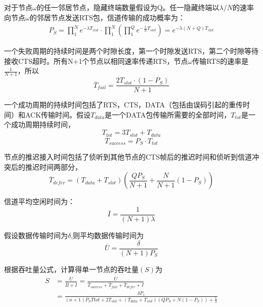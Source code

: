 对于节点$\omega$的任一邻居节点，隐藏终端数量假设为Q。任一隐藏终端以$\lambda/N$的速率向节点$\omega$的邻居节点发送RTS包，信道传输的成功概率为：
\begin{equation}
\begin{aligned}
P_S=\prod^N_1 e^{-\lambda T_{slot}}\cdot \prod^N_1 (\prod^Q_1 e^{-\frac{\lambda}{N} T_{slot}})= e^{-\lambda (N+Q) T_{slot}}
\end{aligned}
\end{equation}

一个失败周期的持续时间是两个时隙长度，第一个时隙发送RTS，第二个时隙等待接收CTS超时。所有N+1个节点以相同速率传递RTS，节点$\omega$传输RTS的速率是$\frac{1}{N+1}$，所以
\begin{equation}
\overline T_{fail}=\frac{{2T_{slot}}\cdot(1-P_S)}{N+1}
\end{equation}

一个成功周期的持续时间包括了RTS，CTS，DATA（包括由误码引起的重传时间）和ACK传输时间。假设$T_{data}$是一个DATA包传输所需要的全部时间，$T_{tot}$是一个成功周期持续时间，
\begin{equation}
T_{tot}=3T_{slot}+T_{data}
\end{equation}
\begin{equation}
\overline T_{success}=P_S \cdot T_{tot}
\end{equation}

节点的推迟接入时间包括了侦听到其他节点的CTS帧后的推迟时间和侦听到信道冲突后的推迟时间两部分，
\begin{equation}
\overline T_{defer}=(T_{data}+T_{slot})(\frac{QP_S}{N+1}+\frac{N}{N+1}(1-P_S)) 
\end{equation}

信道平均空闲时间为：
\begin{equation}
\overline I=\frac{1}{(N+1)\lambda}
\end{equation}

假设数据传输时间为$\delta$,则平均数据传输时间为
\begin{equation}
\overline U=\frac{\delta}{(N+1)P_S}
\end{equation}

根据吞吐量公式，计算得单一节点的吞吐量$(S)$为
\begin{equation}
\begin{aligned}
S&=\frac{\overline U}{\overline B+\overline I}=\frac{\overline U}{\overline T_{success}+\overline T_{fail}+\overline T_{defer}+\overline I}\\
&=\frac{\delta P_s}{(n+1)P_S T{tot}+2T_{slot}+(T_{data}+T_{slot})(QP_S+N(1-P_S))+\frac{1}{\lambda}}
\end{aligned}
\end{equation}

\endinput